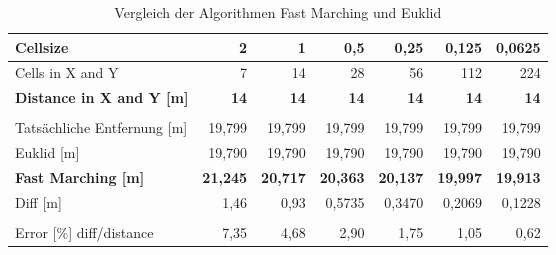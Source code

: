 \begin{table}[htbp]
\begin{tabular}{|l|r|r|r|r|r|r|}
\hline
Cellsize & 2 & 1 & 0,5 & 0,25 & 0,125 & 0,0625 \\ \hline
Cells in X and Y & 7 & 14 & 28 & 56 & 112 & 224 \\ \hline
\textbf{Distance in X and Y [m]} & \textbf{14} & \textbf{14} & \textbf{14} & \textbf{14} & \textbf{14} & \textbf{14} \\ \hline
 & \multicolumn{1}{l|}{} & \multicolumn{1}{l|}{} & \multicolumn{1}{l|}{} & \multicolumn{1}{l|}{} & \multicolumn{1}{l|}{} & \multicolumn{1}{l|}{} \\ \hline
Tatsächliche Entfernung [m] & 19,799 & 19,799 & 19,799 & 19,799 & 19,799 & 19,799 \\ \hline
Euklid [m] & 19,790 & 19,790 & 19,790 & 19,790 & 19,790 & 19,790 \\ \hline
\textbf{Fast Marching [m]} & \textbf{21,245} & \textbf{20,717} & \textbf{20,363} & \textbf{20,137} & \textbf{19,997} & \textbf{19,913} \\ \hline
Diff [m] & 1,46 & 0,93 & 0,5735 & 0,3470 & 0,2069 & 0,1228 \\ \hline
 & \multicolumn{1}{l|}{} & \multicolumn{1}{l|}{} & \multicolumn{1}{l|}{} & \multicolumn{1}{l|}{} & \multicolumn{1}{l|}{} & \multicolumn{1}{l|}{} \\ \hline
Error [\%] diff/distance & 7,35 & 4,68 & 2,90 & 1,75 & 1,05 & 0,62 \\ \hline
\end{tabular}
\caption{Vergleich der Algorithmen Fast Marching und Euklid}
\label{tab_euklid_fm_vergleich}
\end{table}

